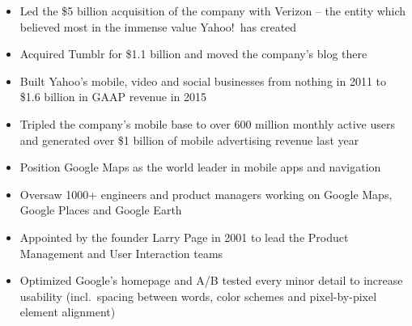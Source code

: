\documentclass[10pt,a4paper,ragged2e]{altacv}
\begin{document}
\begin{paracol}{2}


\begin{itemize}
\item Led the \$5 billion acquisition of the company with Verizon -- the entity which believed most in the immense value Yahoo!\ has created
\item Acquired Tumblr for \$1.1 billion and moved the company's blog there
\item Built Yahoo's mobile, video and social businesses from nothing in 2011 to \$1.6 billion in GAAP revenue in 2015
\item Tripled the company's mobile base to over 600 million monthly active users and generated over \$1 billion of mobile advertising revenue last year
\end{itemize}

\divider

\begin{itemize}
\item Position Google Maps as the world leader in mobile apps and navigation
\item Oversaw 1000+ engineers and product managers working on Google Maps, Google Places and Google Earth
\end{itemize}

\divider


\divider


\begin{itemize}
\item Appointed by the founder Larry Page in 2001 to lead the Product Management and User Interaction teams
\item Optimized Google's homepage and A/B tested every minor detail to increase usability (incl.~spacing between words, color schemes and pixel-by-pixel element alignment)
\end{itemize}



\end{paracol}
\end{document}
